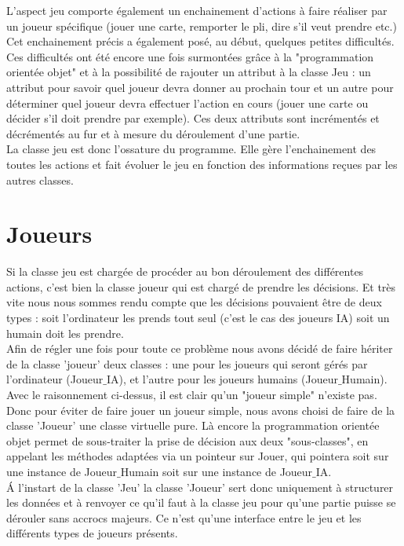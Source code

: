 \documentclass[a4paper,11pt]{article}
\begin{document}
L'aspect jeu comporte également un enchainement d'actions à faire réaliser par un joueur spécifique (jouer une carte, remporter le pli, dire s'il veut prendre etc.) Cet enchainement précis a également posé, au début, quelques petites difficultés. Ces difficultés ont été encore une fois surmontées grâce à la "programmation orientée objet" et à la possibilité de rajouter un attribut à la classe Jeu : un attribut pour savoir quel joueur devra donner au prochain tour et un autre pour déterminer quel joueur devra effectuer l'action en cours (jouer une carte ou décider s'il doit prendre par exemple). Ces deux attributs sont incrémentés et décrémentés au fur et à mesure du déroulement d'une partie.\\

La classe jeu est donc l'ossature du programme. Elle gère l'enchainement des toutes les actions et fait évoluer le jeu en fonction des informations reçues par les autres classes.
\clearpage
\section{Joueurs}
Si la classe jeu est chargée de procéder au bon déroulement des différentes actions, c'est bien la classe joueur qui est chargé de prendre les décisions. Et très vite nous nous sommes rendu compte que les décisions pouvaient être de deux types : soit l'ordinateur les prends tout seul (c'est le cas des joueurs IA) soit un humain doit les prendre.\\

Afin de régler une fois pour toute ce problème nous avons décidé de faire hériter de la classe 'joueur' deux classes : une pour les joueurs qui seront gérés par l'ordinateur (Joueur$\_$IA), et l'autre pour les joueurs humains (Joueur$\_$Humain). \\

Avec le raisonnement ci-dessus, il est clair qu'un "joueur simple" n'existe pas. Donc pour éviter de faire jouer un joueur simple, nous avons choisi de faire de la classe 'Joueur' une classe virtuelle pure. Là encore la programmation orientée objet permet de sous-traiter la prise de décision aux deux "sous-classes", en appelant les méthodes adaptées via un pointeur sur Jouer, qui pointera soit sur une instance de Joueur$\_$Humain soit sur une instance de Joueur$\_$IA.\\

\'A l'instart de la classe 'Jeu' la classe 'Joueur' sert donc uniquement à structurer les données et à renvoyer ce qu'il faut à la classe jeu pour qu'une partie puisse se dérouler sans accrocs majeurs. Ce n'est qu'une interface entre le jeu et les différents types de joueurs présents.
\end{document}
